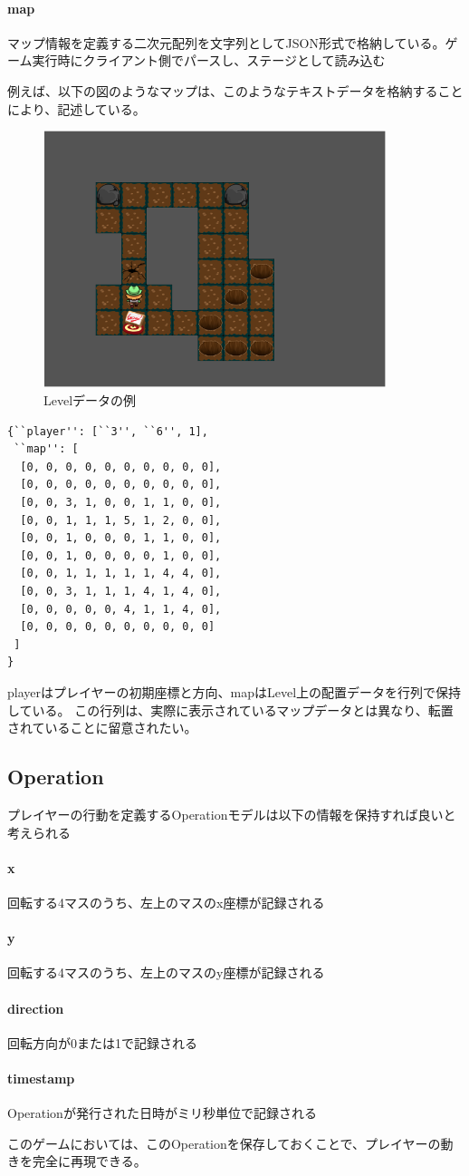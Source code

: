 \paragraph{map}
マップ情報を定義する二次元配列を文字列としてJSON形式で格納している。ゲーム実行時にクライアント側でパースし、ステージとして読み込む

例えば、以下の図のようなマップは、このようなテキストデータを格納することにより、記述している。

\begin{figure}[htbp]
  \begin{center}
    \includegraphics[bb=0 0  643 482, width=10cm]{images/json.png}
  \end{center}
  \caption{Levelデータの例}
  \label{fig:one}
\end{figure}

\begin{verbatim}
{``player'': [``3'', ``6'', 1], 
 ``map'': [
  [0, 0, 0, 0, 0, 0, 0, 0, 0, 0], 
  [0, 0, 0, 0, 0, 0, 0, 0, 0, 0], 
  [0, 0, 3, 1, 0, 0, 1, 1, 0, 0], 
  [0, 0, 1, 1, 1, 5, 1, 2, 0, 0], 
  [0, 0, 1, 0, 0, 0, 1, 1, 0, 0], 
  [0, 0, 1, 0, 0, 0, 0, 1, 0, 0], 
  [0, 0, 1, 1, 1, 1, 1, 4, 4, 0], 
  [0, 0, 3, 1, 1, 1, 4, 1, 4, 0], 
  [0, 0, 0, 0, 0, 4, 1, 1, 4, 0], 
  [0, 0, 0, 0, 0, 0, 0, 0, 0, 0]
 ]
}
\end{verbatim}
playerはプレイヤーの初期座標と方向、mapはLevel上の配置データを行列で保持している。
この行列は、実際に表示されているマップデータとは異なり、転置されていることに留意されたい。

\subsection{Operation}
プレイヤーの行動を定義するOperationモデルは以下の情報を保持すれば良いと考えられる

\paragraph{x}
回転する4マスのうち、左上のマスのx座標が記録される
\paragraph{y}
回転する4マスのうち、左上のマスのy座標が記録される
\paragraph{direction}
回転方向が0または1で記録される
\paragraph{timestamp}
Operationが発行された日時がミリ秒単位で記録される

このゲームにおいては、このOperationを保存しておくことで、プレイヤーの動きを完全に再現できる。
